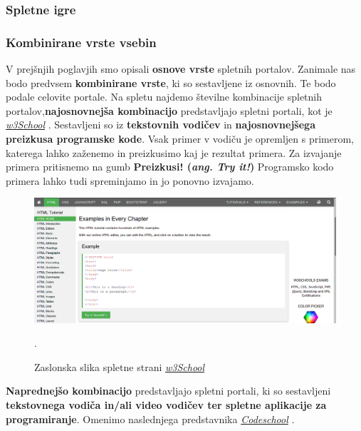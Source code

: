\subsubsection{Spletne igre}
\label{sec:spletne_igre}




\subsubsection{Kombinirane vrste vsebin}
\label{sec:kombinirane_vrste_vsebin}

V prejšnjih poglavjih smo opisali \textbf{osnove vrste} spletnih
portalov. Zanimale nas bodo predvsem \textbf{kombinirane vrste}, ki so
sestavljene iz osnovnih. Te bodo podale celovite portale. Na spletu
najdemo številne kombinacije spletnih portalov,\textbf{najosnovnejša
kombinacijo} predstavljajo spletni portali, kot je
\emph{\href{http://www.w3schools.com/}{w3School}}
\cite{web:w3school}. Sestavljeni so iz \textbf{tekstovnih vodičev} in
\textbf{najosnovnejšega preizkusa programske kode}. Vsak primer v
vodiču je opremljen s primerom, katerega lahko zaženemo in preizkusimo
kaj je rezultat primera. Za izvajanje primera pritisnemo na gumb
\textbf{Preizkusi!  (\emph{ang. Try it!})} Programsko kodo primera
lahko tudi spreminjamo in jo ponovno izvajamo.

\begin{figure}[h!]
    \includegraphics [width=1\linewidth, keepaspectratio =
    1] {./images/sc_web/w3school.png}
    \caption{Zaslonska slika spletne strani
      \emph{\href{http://www.w3schools.com/}{w3School}}
      \cite{web:w3school}}.
    \label{fig:scr:web:w3school}
\end{figure}

\textbf{Naprednejšo kombinacijo} predstavljajo spletni portali, ki so
sestavljeni \textbf{tekstovnega vodiča in/ali video vodičev ter
  spletne aplikacije za programiranje}. Omenimo naslednjega
predstavnika \emph{\href{https://www.codeschool.com/}{Codeschool}}
\cite{web:codeschool}.

